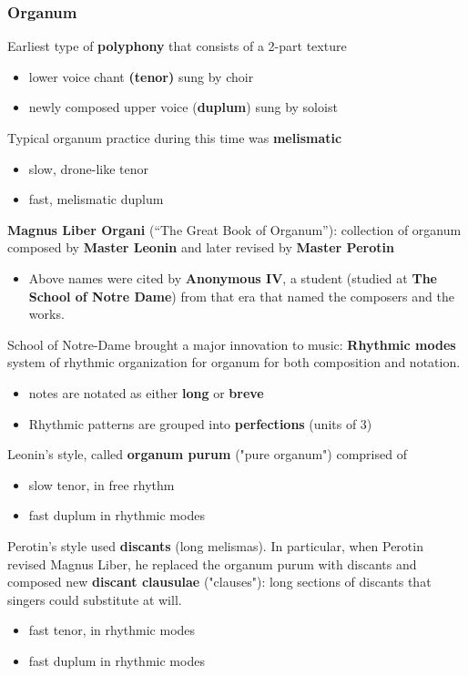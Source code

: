 \documentclass{article}
\begin{document}
  \subsubsection{Organum}
  Earliest type of \textbf{polyphony} that consists of a 2-part texture 
  \begin{itemize}
    \item lower voice chant \textbf{(tenor)} sung by choir
    \item newly composed upper voice (\textbf{duplum}) sung by soloist
  \end{itemize}
  Typical organum practice during this time was \textbf{melismatic}
  \begin{itemize}
    \item slow, drone-like tenor
    \item fast, melismatic duplum
  \end{itemize}
  \textbf{Magnus Liber Organi} (“The Great Book of Organum”): collection of organum composed by \textbf{Master Leonin} and later revised by \textbf{Master Perotin}
  \begin{itemize}
    \item Above names were cited by \textbf{Anonymous IV}, a student (studied at \textbf{The School of Notre Dame}) from that era that named the composers and the works.
  \end{itemize}
  School of Notre-Dame brought a major innovation to music: \textbf{Rhythmic modes} system of rhythmic organization for organum for both composition and notation.
  \begin{itemize}
    \item notes are notated as either \textbf{long} or \textbf{breve} 
    \item Rhythmic patterns are grouped into \textbf{perfections} (units of 3)
  \end{itemize}
  Leonin's style, called \textbf{organum purum} ("pure organum") comprised of
  \begin{itemize}
    \item slow tenor, in free rhythm
    \item fast duplum in rhythmic modes
  \end{itemize}
  Perotin's style used \textbf{discants} (long melismas). In particular, when Perotin revised Magnus Liber, he replaced the organum purum with discants and composed new \textbf{discant clausulae} ("clauses"): long sections of discants that singers could substitute at will.
  \begin{itemize}
    \item fast tenor, in rhythmic modes
    \item fast duplum in rhythmic modes
  \end{itemize}
\end{document}

